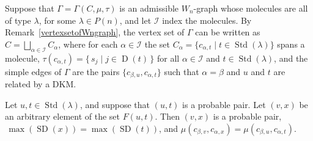 \documentclass[ALCO,ThmDefs,Unicode,epreuves]{cedram}
\DeclareMathOperator{\STD}{Std}
\DeclareMathOperator{\SD}{SD}
\DeclareMathOperator{\D}{D}
\begin{document}
Suppose that $\Gamma = \Gamma(C,\mu,\tau)$ is an admissible $W_n$-graph
whose molecules are all of type $\lambda$, for some $\lambda\in P(n)$,
and let $\mathcal{I}$ index the molecules.
By Remark~\ref{vertexsetofWngraph}, the vertex set of $\Gamma$
can be written as $C=\bigsqcup_{\alpha\in\mathcal{I}}C_{\alpha}$,
where for each $\alpha\in\mathcal{I}$ the set
$C_{\alpha}=\{c_{\alpha,t}\mid t\in\STD(\lambda)\}$ spans a molecule,
$\tau(c_{\alpha,t})=\{\,s_j\mid j\in\D(t)\,\}$ for all $\alpha\in\mathcal{I}$ and $t\in\STD(\lambda)$,
and the simple edges of $\Gamma$ are the pairs $\{c_{\beta,u},c_{\alpha,t}\}$ such that
$\alpha=\beta$ and $u$ and $t$ are related by a DKM.

\begin{lemm}\label{linktominimalCor}
Let $u,t\in\STD(\lambda)$, and suppose that $(u,t)$ is a probable pair.
Let $(v,x)$ be an arbitrary element of the set $F(u,t)$. Then $(v,x)$ is a
probable pair, $\,\max(\SD(x))=\max(\SD(t))$, and
$\mu(c_{\beta,v},c_{\alpha,x})=\mu(c_{\beta,u},c_{\alpha,t})$.
\end{lemm}
\end{document}
